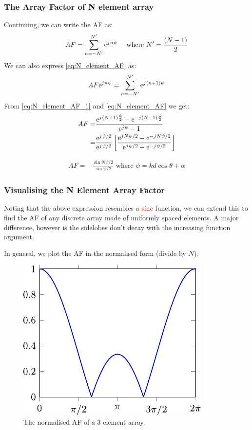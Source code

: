 \documentclass[10pt]{beamer}
\newcommand{\e}{\mathrm{e}} %
\renewcommand{\j}{{j}\mkern1mu} %
\begin{document}
\begin{frame}[fragile]
    \frametitle{The Array Factor of N element array}
Continuing, we can write the AF as:
\small
\begin{equation}
    AF=\sum_{n=-N'}^{N'} \e^{\j n \psi} \quad \text { where } N' =\frac{(N-1)}{2}
    \label{eq:N_element_AF}
\end{equation}
\normalsize
We can also express \eqref{eq:N_element_AF} as:
\small
\begin{equation}
    AF \e^{\j n \psi} =\sum_{n=-N'}^{N'} \e^{\j (n+1) \psi}
    \label{eq:N_element_AF_1}
\end{equation}
\normalsize
From  \eqref{eq:N_element_AF_1} and \eqref{eq:N_element_AF} we get:
\small
\begin{align*}
    AF {}=& \frac{\e^{\j (N+1)\frac{\psi}{2}} - \e^{-\j (N-1)\frac{\psi}{2}}}{\e^{\j \psi} - 1} \\
    {}=& \frac{\e^{\j \psi/2 }}{\e^{\j \psi/2 }} \left[\frac{\e^{\j N\psi/2} - \e^{-\j N\psi/2}}{\e^{\j \psi/2} - \e^{-\j \psi/2}}\right]
\end{align*}
\normalsize
\begin{tcolorbox}[colback=blue!5]
    \begin{align*}
        AF {}=& \frac{\sin N \psi/2 }{\sin \psi/2 } \text { where } \psi =k d \cos \theta + \alpha
    \end{align*}
  \end{tcolorbox}
\end{frame}


\begin{frame}
    \frametitle{Visualising the N Element Array Factor}
Noting that the above expression resembles a \textcolor{red}{sinc} function, we can extend this to find the AF of any discrete array made of uniformly spaced elements. A major difference, however is the sidelobes don't decay with the increasing function argument.

In general, we plot the AF in the normalised form (divide by $N$).

\begin{figure}[h!]
    \centering
    \includegraphics[width=.4\textwidth]{sinc.pdf}
    \caption{The normalised AF of a 3 element array.}
    \label{fig:3_element}
\end{figure} 
\end{frame}
\end{document}
